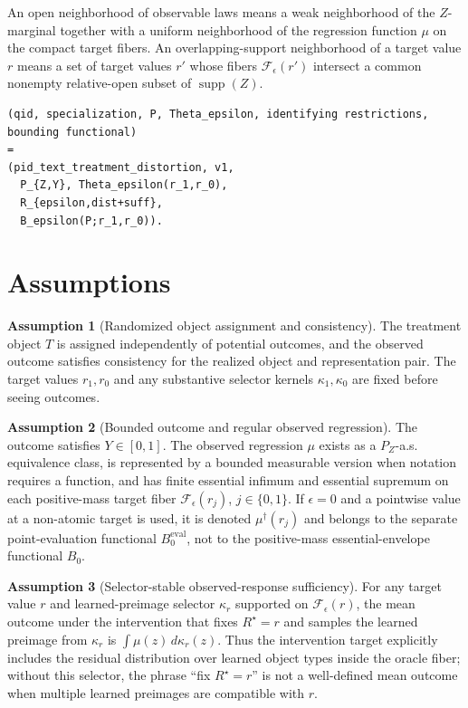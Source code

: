 \documentclass[11pt]{article}
\theoremstyle{definition}
\newtheorem{assumption}{Assumption}
\theoremstyle{plain}
\theoremstyle{remark}
\begin{document}
An open neighborhood of observable laws means a weak neighborhood of the \(Z\)-marginal together with a uniform neighborhood of the regression function \(\mu\) on the compact target fibers.  An overlapping-support neighborhood of a target value \(r\) means a set of target values \(r'\) whose fibers \(\mathcal F_\epsilon(r')\) intersect a common nonempty relative-open subset of \(\operatorname{supp}(Z)\).

\begin{verbatim}
(qid, specialization, P, Theta_epsilon, identifying restrictions, bounding functional)
=
(pid_text_treatment_distortion, v1,
  P_{Z,Y}, Theta_epsilon(r_1,r_0),
  R_{epsilon,dist+suff},
  B_epsilon(P;r_1,r_0)).
\end{verbatim}

\section{Assumptions}
\begin{assumption}[Randomized object assignment and consistency]\label{ass:randomized-consistency}
The treatment object \(T\) is assigned independently of potential outcomes, and the observed outcome satisfies consistency for the realized object and representation pair.  The target values \(r_1,r_0\) and any substantive selector kernels \(\kappa_1,\kappa_0\) are fixed before seeing outcomes.
\end{assumption}

\begin{assumption}[Bounded outcome and regular observed regression]\label{ass:bounded-regular}
The outcome satisfies \(Y\in[0,1]\).  The observed regression \(\mu\) exists as a \(P_Z\)-a.s. equivalence class, is represented by a bounded measurable version when notation requires a function, and has finite essential infimum and essential supremum on each positive-mass target fiber \(\mathcal F_\epsilon(r_j)\), \(j\in\{0,1\}\).  If \(\epsilon=0\) and a pointwise value at a non-atomic target is used, it is denoted \(\mu^\dagger(r_j)\) and belongs to the separate point-evaluation functional \(B^{\mathrm{eval}}_0\), not to the positive-mass essential-envelope functional \(B_0\).
\end{assumption}

\begin{assumption}[Selector-stable observed-response sufficiency]\label{ass:selector-sufficiency}
For any target value \(r\) and learned-preimage selector \(\kappa_r\) supported on \(\mathcal F_\epsilon(r)\), the mean outcome under the intervention that fixes \(R^\star=r\) and samples the learned preimage from \(\kappa_r\) is \(\int\mu(z)\,d\kappa_r(z)\).  Thus the intervention target explicitly includes the residual distribution over learned object types inside the oracle fiber; without this selector, the phrase ``fix \(R^\star=r\)'' is not a well-defined mean outcome when multiple learned preimages are compatible with \(r\).
\end{assumption}
\end{document}
